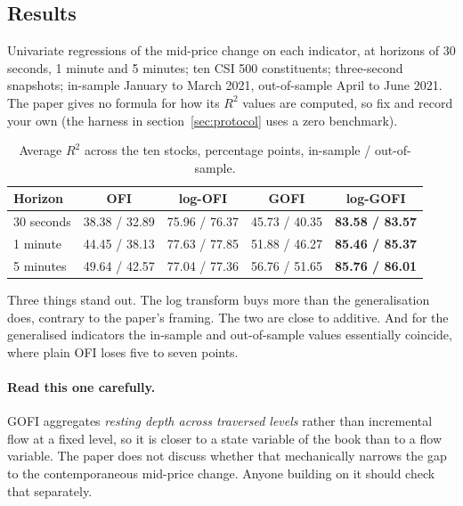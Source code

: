\documentclass[11pt]{article}
\begin{document}
\subsection{Results}

Univariate regressions of the mid-price change on each indicator, at horizons of
30 seconds, 1 minute and 5 minutes; ten CSI 500 constituents; three-second
snapshots; in-sample January to March 2021, out-of-sample April to June 2021.
The paper gives no formula for how its $R^2$ values are computed, so fix and
record your own (the harness in section~\ref{sec:protocol} uses a zero
benchmark).

\begin{table}[h]
\centering
\captionsetup{font=small}
\caption{Average $R^2$ across the ten stocks, percentage points, in-sample /
out-of-sample.}
\small
\begin{tabular}{lcccc}
\toprule
Horizon & OFI & log-OFI & GOFI & log-GOFI \\
\midrule
30 seconds & 38.38 / 32.89 & 75.96 / 76.37 & 45.73 / 40.35 & \textbf{83.58 / 83.57} \\
1 minute   & 44.45 / 38.13 & 77.63 / 77.85 & 51.88 / 46.27 & \textbf{85.46 / 85.37} \\
5 minutes  & 49.64 / 42.57 & 77.04 / 77.36 & 56.76 / 51.65 & \textbf{85.76 / 86.01} \\
\bottomrule
\end{tabular}
\end{table}

Three things stand out. The log transform buys more than the generalisation
does, contrary to the paper's framing. The two are close to additive. And for
the generalised indicators the in-sample and out-of-sample values essentially
coincide, where plain OFI loses five to seven points.

\paragraph{Read this one carefully.} GOFI aggregates \emph{resting depth across
traversed levels} rather than incremental flow at a fixed level, so it is closer
to a state variable of the book than to a flow variable. The paper does not
discuss whether that mechanically narrows the gap to the contemporaneous
mid-price change. Anyone building on it should check that separately.
\end{document}
